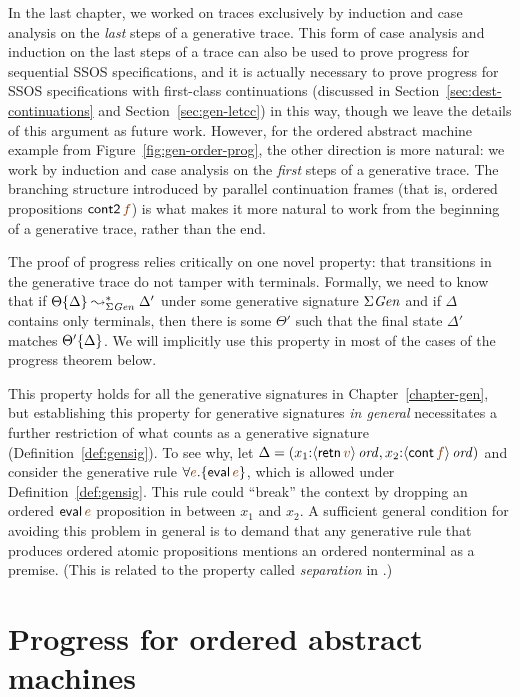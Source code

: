 In the last chapter, we worked on traces exclusively by induction and
case analysis on the {\it last} steps of a generative trace.  This
form of case analysis and induction on the last steps of a trace can
also be used to prove progress for sequential SSOS specifications, and
it is actually necessary to prove progress for SSOS specifications
with first-class continuations (discussed in
Section~\ref{sec:dest-continuations} and Section~\ref{sec:gen-letcc})
in this way, though we leave the details of this argument as future
work. However, for the ordered abstract machine example from
Figure~\ref{fig:gen-order-prog}, the other direction is more natural:
we work by induction and case analysis on the {\it first} steps of a
generative trace. The branching structure introduced by parallel
continuation frames (that is, ordered propositions ${\sf
  cont2}\,\lf{f}$) is what makes it more natural to work from the
beginning of a generative trace, rather than the end.

The proof of progress relies critically on one novel property: that
transitions in the generative trace do not tamper with terminals.
Formally, we need to know that if ${\Theta}\{{\Delta}\}
\leadsto^*_{\Sigma{\it Gen}} \Delta'$ under some generative signature
$\Sigma{\it Gen}$ and if $\Delta$ contains only terminals, then there
is some $\Theta'$ such that the final state $\Delta'$ matches
${\Theta'}\{{\Delta}\}$. We will implicitly use this property in
most of the cases of the progress theorem below.

This property holds for all the generative signatures in
Chapter~\ref{chapter-gen}, but establishing this property for
generative signatures {\it in general} necessitates a further
restriction of what counts as a generative signature
(Definition~\ref{def:gensig}). To see why, let $\Delta =
(x_1{:}\istrue{\susp{{\sf retn}\,\lf{v}}}, x_2{:}\istrue{\susp{{\sf
      cont}\,\lf{f}}})$ and consider the generative rule $\forall
\lf{e}. \{ {\sf eval}\,\lf{e} \}$, which is allowed under
Definition~\ref{def:gensig}. This rule could ``break'' the context by
dropping an ordered ${\sf eval}\,\lf{e}$ proposition in between $x_1$
and $x_2$. A sufficient general condition for avoiding this problem in
general is to demand that any generative rule that produces ordered
atomic propositions mentions an ordered nonterminal as a premise.
(This is related to the property called {\it separation} in 
\cite{simmons08linear}.)

\section{Progress for ordered abstract machines}

